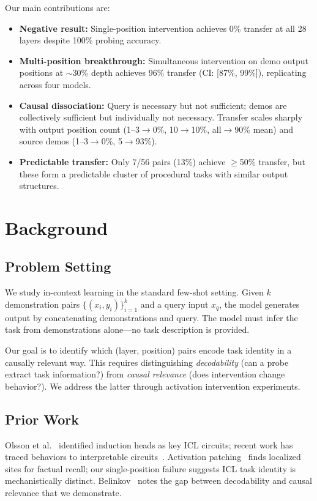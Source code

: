 \documentclass[runningheads]{llncs}
\begin{document}
Our main contributions are:
\begin{itemize}
    \item \textbf{Negative result:} Single-position intervention achieves 0\% transfer at all 28 layers despite 100\% probing accuracy.
    \item \textbf{Multi-position breakthrough:} Simultaneous intervention on demo output positions at $\sim$30\% depth achieves 96\% transfer (CI: [87\%, 99\%]), replicating across four models.
    \item \textbf{Causal dissociation:} Query is necessary but not sufficient; demos are collectively sufficient but individually not necessary. Transfer scales sharply with output position count (1--3$\to$0\%, 10$\to$10\%, all$\to$90\% mean) and source demos (1--3$\to$0\%, 5$\to$93\%).
    \item \textbf{Predictable transfer:} Only 7/56 pairs (13\%) achieve $\geq$50\% transfer, but these form a predictable cluster of procedural tasks with similar output structures.
\end{itemize}

\section{Background}
\label{sec:background}

\subsection{Problem Setting}

We study in-context learning in the standard few-shot setting. Given $k$ demonstration pairs $\{(x_i, y_i)\}_{i=1}^k$ and a query input $x_q$, the model generates output by concatenating demonstrations and query. The model must infer the task from demonstrations alone---no task description is provided.

Our goal is to identify which (layer, position) pairs encode task identity in a causally relevant way. This requires distinguishing \emph{decodability} (can a probe extract task information?) from \emph{causal relevance} (does intervention change behavior?). We address the latter through activation intervention experiments.

\subsection{Prior Work}

Olsson et al.~\cite{olsson2022context} identified induction heads as key ICL circuits; recent work has traced behaviors to interpretable circuits~\cite{wang2023interpretability,conmy2023towards}. Activation patching~\cite{vig2020investigating,meng2022locating} finds localized sites for factual recall; our single-position failure suggests ICL task identity is mechanistically distinct. Belinkov~\cite{belinkov2019analysis} notes the gap between decodability and causal relevance that we demonstrate.
\end{document}
